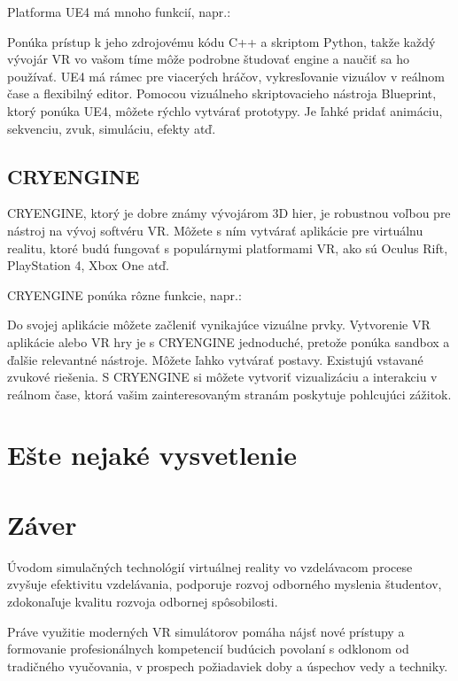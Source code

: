 \documentclass[10pt,twoside,slovak,a4paper]{article}
\begin{document}
Platforma UE4 má mnoho funkcií, napr.:

Ponúka prístup k jeho zdrojovému kódu C++ a skriptom Python, takže každý vývojár VR vo vašom tíme môže podrobne študovať engine a naučiť sa ho používať.
UE4 má rámec pre viacerých hráčov, vykresľovanie vizuálov v reálnom čase a flexibilný editor.
Pomocou vizuálneho skriptovacieho nástroja Blueprint, ktorý ponúka UE4, môžete rýchlo vytvárať prototypy.
Je ľahké pridať animáciu, sekvenciu, zvuk, simuláciu, efekty atď.
\cite{devteam_2021}


\subsection {CRYENGINE}
CRYENGINE, ktorý je dobre známy vývojárom 3D hier, je robustnou voľbou pre nástroj na vývoj softvéru VR. Môžete s ním vytvárať aplikácie pre virtuálnu realitu, ktoré budú fungovať s populárnymi platformami VR, ako sú Oculus Rift, PlayStation 4, Xbox One atď.

CRYENGINE ponúka rôzne funkcie, napr.:

Do svojej aplikácie môžete začleniť vynikajúce vizuálne prvky.
Vytvorenie VR aplikácie alebo VR hry je s CRYENGINE jednoduché, pretože ponúka sandbox a ďalšie relevantné nástroje.
Môžete ľahko vytvárať postavy.
Existujú vstavané zvukové riešenia.
S CRYENGINE si môžete vytvoriť vizualizáciu a interakciu v reálnom čase, ktorá vašim zainteresovaným stranám poskytuje pohlcujúci zážitok.
\cite{devteam_2021}



\section{Ešte nejaké vysvetlenie} 





\section{Záver} \label{zaver} %

Úvodom simulačných technológií virtuálnej reality vo vzdelávacom procese
zvyšuje efektivitu vzdelávania, podporuje rozvoj odborného myslenia študentov,
zdokonaľuje kvalitu rozvoja odbornej spôsobilosti.\vspace{5mm}

Práve využitie moderných VR simulátorov pomáha nájsť nové prístupy a
formovanie profesionálnych kompetencií budúcich povolaní s
odklonom od tradičného vyučovania, v prospech požiadaviek doby
a úspechov vedy a techniky.
\cite{lvov2019simulation}





\end{document}
